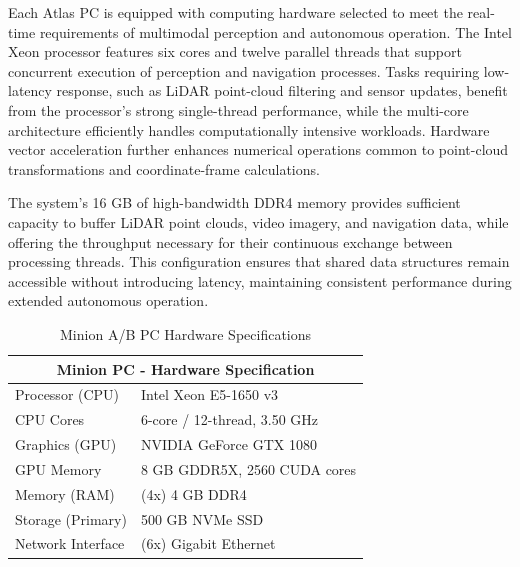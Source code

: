 \documentclass{erauthesis}
\begin{document}
Each Atlas PC is equipped with computing hardware selected to meet the real-time requirements of multimodal perception and autonomous operation.  
The Intel Xeon processor features six cores and twelve parallel threads that support concurrent execution of perception and navigation processes.  
Tasks requiring low-latency response, such as LiDAR point-cloud filtering and sensor updates, benefit from the processor’s strong single-thread performance, while the multi-core architecture efficiently handles computationally intensive workloads.  
Hardware vector acceleration further enhances numerical operations common to point-cloud transformations and coordinate-frame calculations.

The system’s 16 GB of high-bandwidth DDR4 memory provides sufficient capacity to buffer LiDAR point clouds, video imagery, and navigation data, while offering the throughput necessary for their continuous exchange between processing threads.  
This configuration ensures that shared data structures remain accessible without introducing latency, maintaining consistent performance during extended autonomous operation. 

\begin{table}[htpb]
\centering
\begin{tabular}{ll}
\hline
\multicolumn{2}{c}{Minion PC - Hardware Specification} \\
\hline
\hline
Processor (CPU) & Intel Xeon E5-1650 v3 \\
CPU Cores & 6-core / 12-thread, 3.50 GHz \\
Graphics (GPU) & NVIDIA GeForce GTX 1080 \\
GPU Memory & 8 GB GDDR5X, 2560 CUDA cores \\
Memory (RAM) & (4x) 4 GB DDR4 \\
Storage (Primary) & 500 GB NVMe SSD \\
Network Interface & (6x) Gigabit Ethernet \\%
\hline
\end{tabular}
\caption{Minion A/B PC Hardware Specifications}
\label{table:Minion_hardware}
\end{table}
\end{document}
